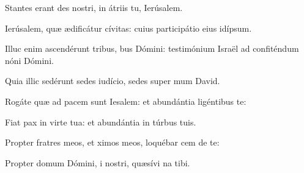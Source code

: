 \item {}

\item Stantes erant des nostri,\psstar{} in átriis tu, Ierúsalem.

\item Ierúsalem, quæ ædificátur  cívitas:\psstar{} cuius participátio eius  idípsum.

\item Illuc enim ascendérunt tribus, bus Dómini:\psstar{} testimónium Israël ad confiténdum nóni Dómini.

\item Quia illic sedérunt sedes  iudício,\psstar{} sedes super mum David.

\item Rogáte quæ ad pacem sunt Iesalem:\psstar{} et abundántia ligéntibus te:

\item Fiat pax in virte tua:\psstar{} et abundántia in túrbus tuis.

\item Propter fratres meos, et ximos meos,\psstar{} loquébar cem de te:

\item Propter domum Dómini, i nostri,\psstar{} quæsívi na tibi.